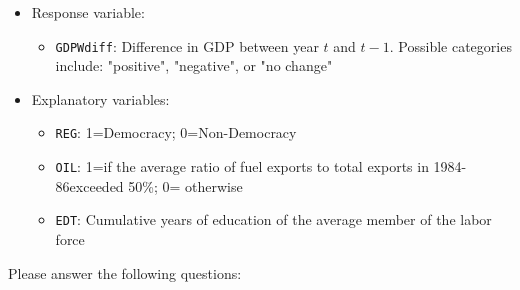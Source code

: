 \documentclass[12pt,letterpaper]{article}
\begin{document}
\begin{itemize}
	\item
	Response variable: 
	\begin{itemize}
		\item \texttt{GDPWdiff}: Difference in GDP between year $t$ and $t-1$. Possible categories include: "positive", "negative", or "no change"
	\end{itemize}
	\item
	Explanatory variables: 
	\begin{itemize}
		\item
		\texttt{REG}: 1=Democracy; 0=Non-Democracy
		\item
		\texttt{OIL}: 1=if the average ratio of fuel exports to total exports in 1984-86exceeded 50\%; 0= otherwise
		\item \texttt{EDT}: Cumulative years of education of the average member of the labor force
	\end{itemize}
	
\end{itemize}

\noindent Please answer the following questions:
\end{document}
